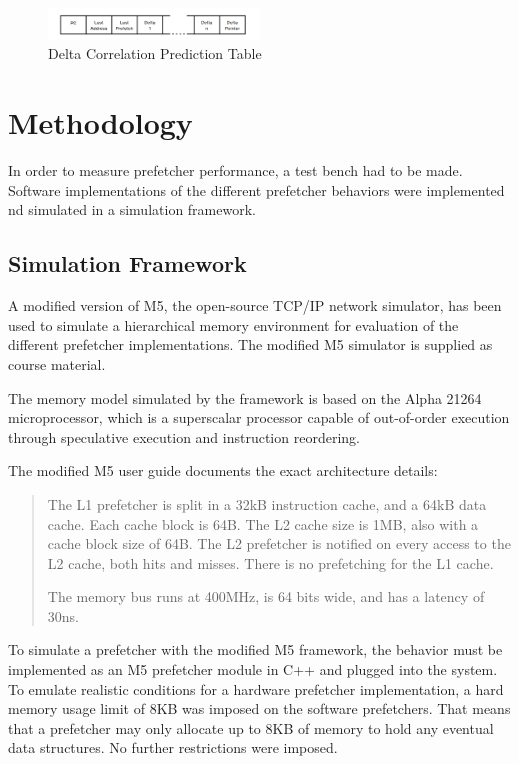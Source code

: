 \documentclass[a4paper]{IEEEtran}
\begin{document}
\begin{figure}[h!]
  \centering
      \includegraphics[width=0.5\textwidth]{Figures/DCTable}
  \caption{Delta Correlation Prediction Table}
  \label{fig:DCTable}
\end{figure}

\section{Methodology}

In order to measure prefetcher performance, a test bench had to be made.
Software implementations of the different prefetcher behaviors were implemented nd simulated in a simulation framework.

\subsection{Simulation Framework}

A modified version of M5, the open-source TCP/IP network simulator\cite{M5paper}, has been used to simulate a hierarchical memory environment for evaluation of the different prefetcher implementations.
The modified M5 simulator is supplied as course material.

The memory model simulated by the framework is based on the Alpha 21264 microprocessor, which is a superscalar processor capable of out-of-order execution through speculative execution and instruction reordering.

The modified M5 user guide documents the exact architecture details:

\begin{quote}
The L1 prefetcher is split in a 32kB instruction cache, and a 64kB data cache.
Each cache block is 64B.
The L2 cache size is 1MB, also with a cache block size of 64B.
The L2 prefetcher is notified on every access to the L2 cache, both hits and misses.
There is no prefetching for the L1 cache.

The memory bus runs at 400MHz, is 64 bits wide, and has a latency of 30ns.~\cite{m5userguide}
\end{quote}

To simulate a prefetcher with the modified M5 framework, the behavior must be implemented as an M5 prefetcher module in C++ and plugged into the system.
To emulate realistic conditions for a hardware prefetcher implementation, a hard memory usage limit of 8KB was imposed on the software prefetchers.
That means that a prefetcher may only allocate up to 8KB of memory to hold any eventual data structures.
No further restrictions were imposed.
\end{document}
